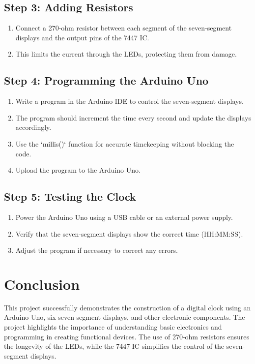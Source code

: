 \documentclass[journal]{IEEEtran}
\begin{document}
\subsection{Step 3: Adding Resistors}
\begin{enumerate}
    \item Connect a 270-ohm resistor between each segment of the seven-segment displays and the output pins of the 7447 IC.
    \item This limits the current through the LEDs, protecting them from damage.
\end{enumerate}

\subsection{Step 4: Programming the Arduino Uno}
\begin{enumerate}
    \item Write a program in the Arduino IDE to control the seven-segment displays.
    \item The program should increment the time every second and update the displays accordingly.
    \item Use the `millis()` function for accurate timekeeping without blocking the code.
    \item Upload the program to the Arduino Uno.
\end{enumerate}

\subsection{Step 5: Testing the Clock}
\begin{enumerate}
    \item Power the Arduino Uno using a USB cable or an external power supply.
    \item Verify that the seven-segment displays show the correct time (HH:MM:SS).
    \item Adjust the program if necessary to correct any errors.
\end{enumerate}


\section{Conclusion}
This project successfully demonstrates the construction of a digital clock using an Arduino Uno, six seven-segment displays, and other electronic components. The project highlights the importance of understanding basic electronics and programming in creating functional devices. The use of 270-ohm resistors ensures the longevity of the LEDs, while the 7447 IC simplifies the control of the seven-segment displays.
\end{document}
